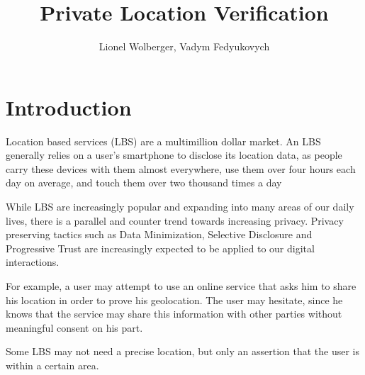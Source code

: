\documentclass{article}
\begin{document}
\title{Private Location Verification}
\author{Lionel Wolberger, Vadym Fedyukovych}
\maketitle

\section{Introduction}

Location based services (LBS) are a multimillion dollar market.
An LBS generally relies on a user's smartphone to disclose its location data, as people carry these devices with them almost everywhere, 
use them over four hours each day on average, 
and touch them over two thousand times a day ~\cite{dscout}

While LBS are increasingly popular and expanding into many areas of our daily lives, there is a  parallel and counter trend towards increasing privacy. 
Privacy preserving tactics such as Data Minimization, Selective Disclosure and Progressive Trust are increasingly expected to be applied to our digital interactions. ~\cite{CCGMDSDPT}

For example, a user may attempt to use an online service that asks him to share his location in order to prove his geolocation.
The user may hesitate, since he knows that the service may share this information with other parties without meaningful consent on his part. 

Some LBS may not need a precise location, but only an assertion that the user is within a certain area. 
\end{document}
